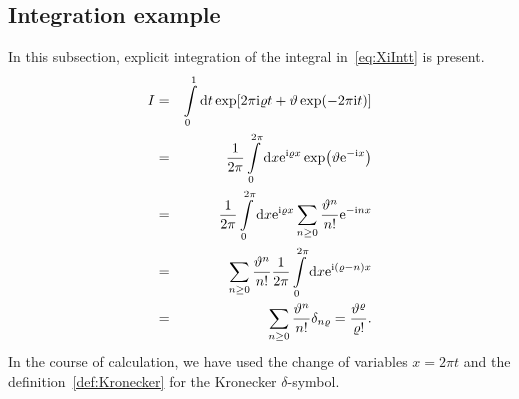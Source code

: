 \documentclass[12pt]{article}
\numberwithin{equation}{section}
\begin{document}
	\subsection{Integration example}
	\label{subsec:int}
	In this subsection, explicit integration of the integral in~\eqref{eq:XiIntt} is present.
	\begin{eqnarray}
		I & = & \int\limits_{0}^{1} {\rm d} t \exp[2\pi {\rm i} \varrho t + \vartheta\exp(-2\pi {\rm i}t)]
		\nonumber\\	
		& = & \frac{1}{2\pi} \int\limits_{0}^{2\pi} {\rm d}x {\rm e}^{{\rm i}\varrho x} \exp(\vartheta {\rm e}^{-{\rm i}x})
		\nonumber\\
		& = & \frac{1}{2\pi} \int\limits_{0}^{2\pi} {\rm d}x {\rm e}^{{\rm i}\varrho x} \sum_{n \geq 0} \frac{\vartheta^n}{n!} {\rm e}^{-{\rm i}nx}
		\nonumber\\
		& = & \sum_{n \geq 0} \frac{\vartheta^n}{n!} \frac{1}{2\pi} \int\limits_{0}^{2\pi} {\rm d}x {\rm e}^{{\rm i}(\varrho - n)x}
		\nonumber\\
		& = & \sum_{n \geq 0} \frac{\vartheta^n}{n!} \delta_{n\varrho} = \frac{\vartheta^{\varrho}}{\varrho!}.
	\end{eqnarray}
	In the course of calculation, we have used the change of variables $x = 2\pi t$ and the definition~\eqref{def:Kronecker} for the Kronecker $\delta$-symbol.
	
	\pagebreak
	
\end{document}
